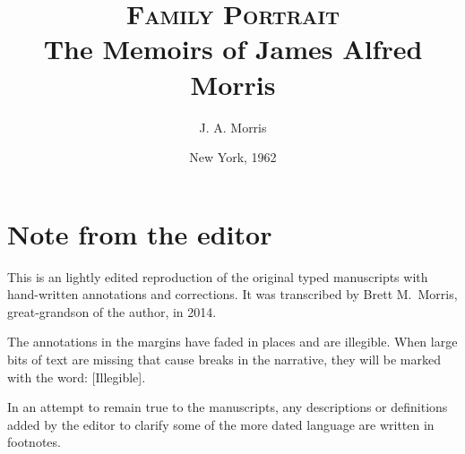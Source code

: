 \documentclass[12pt]{book}              %
\title{\textsc{Family Portrait}\\ The Memoirs of James Alfred Morris}    %
\author{J. A. Morris}              %
\date{New York, 1962}                           %
\begin{document}
\frontmatter                            %

\section*{Note from the editor}
This is an lightly edited reproduction of the original typed manuscripts with hand-written annotations and corrections. It was transcribed by Brett M.~Morris, great-grandson of the author, in 2014. 

The annotations in the margins have faded in places and are illegible. When large bits of text are missing that cause breaks in the narrative, they will be marked with the word: [Illegible]. 

In an attempt to remain true to the manuscripts, any descriptions or definitions added by the editor to clarify some of the more dated language are written in footnotes. 



\maketitle                              %
\tableofcontents                        %
\mainmatter                             %
\end{document}

